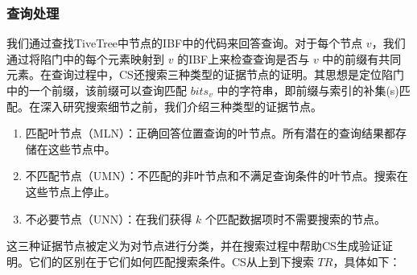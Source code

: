 \documentclass{cumcmthesis}
\numberwithin{equation}{section} %
\numberwithin{figure}{section} %
\numberwithin{table}{section} %
\begin{document}
\subsubsection{查询处理}
我们通过查找TiveTree中节点的IBF中的代码来回答查询。对于每个节点 $v$，我们通过将陷门中的每个元素映射到 $v$ 的IBF上来检查查询是否与 $v$ 中的前缀有共同元素。在查询过程中，CS还搜索三种类型的证据节点的证明。其思想是定位陷门中的一个前缀，该前缀可以查询匹配 $bits_v$ 中的字符串，即前缀与索引的补集(s)匹配。在深入研究搜索细节之前，我们介绍三种类型的证据节点。
\begin{enumerate}[label=\textbullet]
    \item 匹配叶节点（MLN）：正确回答位置查询的叶节点。所有潜在的查询结果都存储在这些节点中。
    \item 不匹配节点（UMN）：不匹配的非叶节点和不满足查询条件的叶节点。搜索在这些节点上停止。
    \item 不必要节点（UNN）：在我们获得 $k$ 个匹配数据项时不需要搜索的节点。
\end{enumerate}
这三种证据节点被定义为对节点进行分类，并在搜索过程中帮助CS生成验证证明。它们的区别在于它们如何匹配搜索条件。CS从上到下搜索 $TR$，具体如下：
\end{document}
